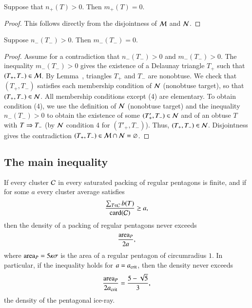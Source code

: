 \begin{lemma}  
  Suppose that $n_+(T)>0$. Then $m_+(T)=0$.
\end{lemma}

\begin{proof} 
  This follows directly from the disjointness of $\mathcal M$ and $\mathcal N$.
\end{proof}

\begin{lemma}  
  Suppose $n_-(T_-)>0$.  Then $m_-(T_-)=0$.
\end{lemma}

\begin{proof}
Assume for a contradiction that $n_-(T_-)>0$ and $m_-(T_-)>0$.  The
inequality $m_-(T_-)>0$ gives the existence of a Delaunay triangle
$T_+$ such that $(T_+,T_-)\in\mathcal M$.  By Lemma~,
triangles $T_+$ and $T_-$ are nonobtuse.  We check
that $(T_+,T_-)$ satisfies each membership condition of $\mathcal N$
(nonobtuse target), so that $(T_+,T_-)\in\mathcal N$.  All membership
conditions except (4) are elementary. To obtain condition (4), we use
the definition of $\mathcal N$ (nonobtuse target) and the inequality
$n_-(T_-)>0$ to obtain the existence of some $(T'_+,T_-)\in\mathcal N$ and of
an obtuse $T$ with $T\Rightarrow T_-$ (by $\mathcal N$ condition 4 for $(T'_+,T_-)$).  Thus,
$(T_+,T_-)\in\mathcal N$. Disjointness gives the contradiction
$(T_+,T_-)\in\mathcal M\cap\mathcal N=\varnothing$.
\end{proof}

\subsection{The main inequality}

\begin{lemma}  
If  every cluster $\mathcal C$ in every saturated packing of regular
  pentagons is finite, and if for some $a$ every cluster average
  satisfies
\begin{equation}\libel{eqn:main}
\frac{\sum_{T\in \C} b(T)}{\card(\C)} \ge a,
\end{equation}
then the density of a packing of regular pentagons never exceeds 
\[
\frac{{\operatorname{area}}_P} {2 a},
\]
where ${\operatorname{area}}_P = 5\kappa\sigma$ is the area of a regular pentagon of
circumradius $1$.  In particular, if the inequality holds for
$a=a_\text{crit}$, then the density never exceeds
\[
\frac{{\operatorname{area}}_P}{2 a_\text{crit}} = \frac{5 - \sqrt{5}}{3},
\] %
the density of the pentagonal ice-ray.
\end{lemma}

